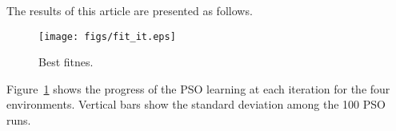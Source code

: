 
\label{sec:results}
The results of this article are presented as follows.

\begin{figure}
\centering
\texttt{[image: figs/fit\_it.eps]}
\caption{Best fitnes.}
\label{fig:fit_it}
\end{figure}

Figure~\ref{fig:fit_it} shows the progress of the PSO learning at each iteration for the four environments. Vertical bars show the standard deviation among the 100 PSO runs. 